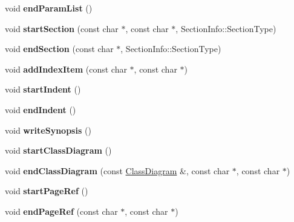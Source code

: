 \begin{DoxyCompactItemize}
void {\bfseries end\+Param\+List} ()
\item 
\mbox{\label{class_html_generator_a8be287f3a8b68b1aaf0ce945a246ef32}} 
void {\bfseries start\+Section} (const char $\ast$, const char $\ast$, Section\+Info\+::\+Section\+Type)
\item 
\mbox{\label{class_html_generator_a0f92a2fa1124ae02396ed560aa925b0f}} 
void {\bfseries end\+Section} (const char $\ast$, Section\+Info\+::\+Section\+Type)
\item 
\mbox{\label{class_html_generator_aa966249e9239eff3631f57211f314504}} 
void {\bfseries add\+Index\+Item} (const char $\ast$, const char $\ast$)
\item 
\mbox{\label{class_html_generator_aafe5fc8d00e32357b60fd4e0b0c8e0e7}} 
void {\bfseries start\+Indent} ()
\item 
\mbox{\label{class_html_generator_ac8a600145a8b33e3dc984a0cb834d859}} 
void {\bfseries end\+Indent} ()
\item 
\mbox{\label{class_html_generator_a80d44096489c83020c550122705afd66}} 
void {\bfseries write\+Synopsis} ()
\item 
\mbox{\label{class_html_generator_a1c8b9863208e217cf6642951ef006498}} 
void {\bfseries start\+Class\+Diagram} ()
\item 
\mbox{\label{class_html_generator_a3884a61305d09d1ecbddfb0bc0fe2733}} 
void {\bfseries end\+Class\+Diagram} (const \mbox{\hyperlink{class_class_diagram}{Class\+Diagram}} \&, const char $\ast$, const char $\ast$)
\item 
\mbox{\label{class_html_generator_a815ab026ba09dceca7ad84157e9eb4dc}} 
void {\bfseries start\+Page\+Ref} ()
\item 
\mbox{\label{class_html_generator_a0d8ff1d418517388be08b4cb8f63ef6e}} 
void {\bfseries end\+Page\+Ref} (const char $\ast$, const char $\ast$)
\item 
\mbox{\label{class_html_generator_ac19bda7a07fbdf7069a7601e97dc2276}} 

\end{DoxyCompactItemize}
